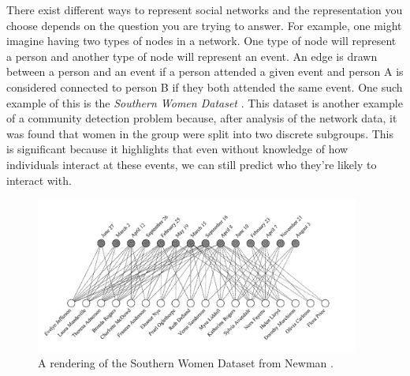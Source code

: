 There exist different ways to represent social networks and the representation you choose depends on the question you are trying to answer. For example, one might imagine having two types of nodes in a network. One type of node will represent a person and another type of node will represent an event. An edge is drawn between a person and an event if a person attended a given event and person A is considered connected to person B if they both attended the same event. One such example of this is the \emph{Southern Women Dataset} \cite{konect:southernwomen}. This dataset is another example of a community detection problem because, after analysis of the network data, it was found that women in the group were split into two discrete subgroups. This is significant because it highlights that even without knowledge of how individuals interact at these events, we can still predict who they're likely to interact with.

\begin{figure}
    \begin{center}
        \includegraphics[width=0.95\textwidth]{img/southern_women}
    \end{center}
    \caption{A rendering of the Southern Women Dataset from Newman \cite[p. 39]{newman10}.}
    \label{fig:southernwomen}
\end{figure}

